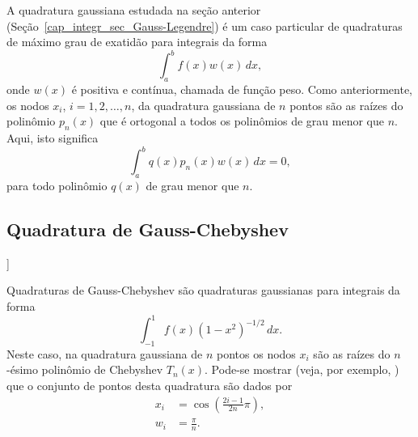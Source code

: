 A quadratura gaussiana estudada na seção anterior (Seção~\ref{cap_integr_sec_Gauss-Legendre}) é um caso particular de quadraturas de máximo grau de exatidão para integrais da forma
\begin{equation}
  \int_a^b f(x)w(x)\,dx,
\end{equation}
onde $w(x)$ é positiva e contínua, chamada de função peso. Como anteriormente, os nodos $x_i$, $i=1, 2, \dotsc, n$, da quadratura gaussiana de $n$ pontos são as raízes do polinômio $p_n(x)$ que é ortogonal a todos os polinômios de grau menor que $n$. Aqui, isto significa
\begin{equation}
  \int_a^b q(x)p_n(x)w(x)\,dx = 0,
\end{equation}
para todo polinômio $q(x)$ de grau menor que $n$.

\subsection{Quadratura de Gauss-Chebyshev}

\begin{flushleft}
  [[tag:revisar]]
\end{flushleft}

Quadraturas de Gauss-Chebyshev são quadraturas gaussianas para integrais da forma
\begin{equation}
  \int_{-1}^1 f(x)(1-x^2)^{-1/2}\,dx.
\end{equation}
Neste caso, na quadratura gaussiana de $n$ pontos os nodos $x_i$ são as raízes do $n$-ésimo polinômio de Chebyshev $T_n(x)$. Pode-se mostrar (veja, por exemplo, \cite[Cap. 7, Sec. 4.1]{Isaacson1994a}) que o conjunto de pontos desta quadratura são dados por
\begin{align}
  x_i &= \cos\left(\frac{2i-1}{2n}\pi\right),\\
  w_i &= \frac{\pi}{n}.
\end{align}

